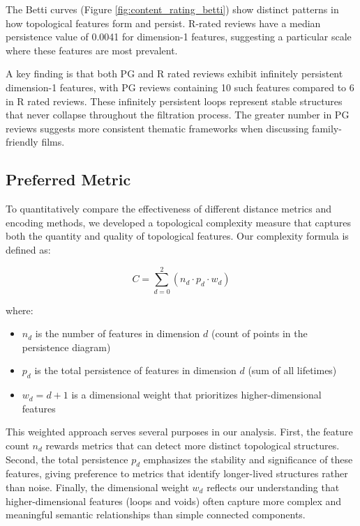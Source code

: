 \documentclass[fleqn,10pt]{SelfArx}
\begin{document}
The Betti curves (Figure \ref{fig:content_rating_betti}) show distinct patterns in how topological features form and persist. R-rated reviews have a median persistence value of 0.0041 for dimension-1 features, suggesting a particular scale where these features are most prevalent.

A key finding is that both PG and R rated reviews exhibit infinitely persistent dimension-1 features, with PG reviews containing 10 such features compared to 6 in R rated reviews. These infinitely persistent loops represent stable structures that never collapse throughout the filtration process. The greater number in PG reviews suggests more consistent thematic frameworks when discussing family-friendly films.

\clearpage
\subsection{Preferred Metric}\label{sec:pref-met}

To quantitatively compare the effectiveness of different distance metrics and encoding methods, we developed a topological complexity measure that captures both the quantity and quality of topological features. Our complexity formula is defined as:

\begin{equation}
C = \sum_{d=0}^{2} (n_d \cdot p_d \cdot w_d)
\end{equation}

where:
\begin{itemize}
    \item $n_d$ is the number of features in dimension $d$ (count of points in the persistence diagram)
    \item $p_d$ is the total persistence of features in dimension $d$ (sum of all lifetimes)
    \item $w_d = d + 1$ is a dimensional weight that prioritizes higher-dimensional features
\end{itemize}

This weighted approach serves several purposes in our analysis. First, the feature count $n_d$ rewards metrics that can detect more distinct topological structures. Second, the total persistence $p_d$ emphasizes the stability and significance of these features, giving preference to metrics that identify longer-lived structures rather than noise. Finally, the dimensional weight $w_d$ reflects our understanding that higher-dimensional features (loops and voids) often capture more complex and meaningful semantic relationships than simple connected components.
\end{document}
